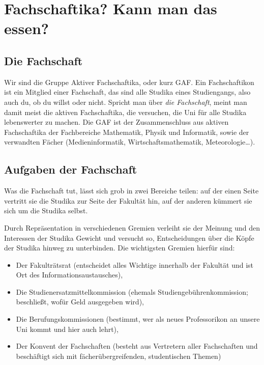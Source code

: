 \chapter{Fachschaftika? Kann man das essen?}

\section{Die Fachschaft}
Wir sind die Gruppe Aktiver Fachschaftika, oder kurz GAF. Ein Fachschaftikon ist ein Mitglied einer Fachschaft, das sind alle Studika eines Studiengangs, also auch du, ob du willst oder nicht. Spricht man über \emph{die Fachschaft}, meint man damit meist die aktiven Fachschaftika, die versuchen, die Uni für alle Studika lebenswerter zu machen. Die GAF ist der Zusammenschluss aus aktiven Fachschaftika der Fachbereiche Mathematik, Physik und Informatik, sowie der verwandten Fächer (Medieninformatik, Wirtschaftsmathematik, Meteorologie\ldots).

\section{Aufgaben der Fachschaft}

Was die Fachschaft tut, lässt sich grob in zwei Bereiche teilen: auf der einen Seite vertritt sie die Studika zur Seite der Fakultät hin, auf der anderen kümmert sie sich um die Studika selbst.

Durch Repräsentation in verschiedenen Gremien verleiht sie der Meinung und den Interessen der Studika Gewicht und versucht so, Entscheidungen über die Köpfe der Studika hinweg zu unterbinden. Die wichtigsten Gremien hierfür sind:
\begin{itemize}
\item Der Fakulträtsrat (entscheidet alles Wichtige innerhalb der Fakultät und ist Ort des Informationsaustausches),
\item Die Studienersatzmittelkommission (ehemals Studiengebührenkommission; beschließt, wofür Geld ausgegeben wird),
\item Die Berufungskommissionen (bestimmt, wer als neues Professorikon an unsere Uni kommt und hier auch lehrt),
\item Der Konvent der Fachschaften (besteht aus Vertretern aller Fachschaften und beschäftigt sich mit fächerübergreifenden, studentischen Themen)
\end{itemize}

